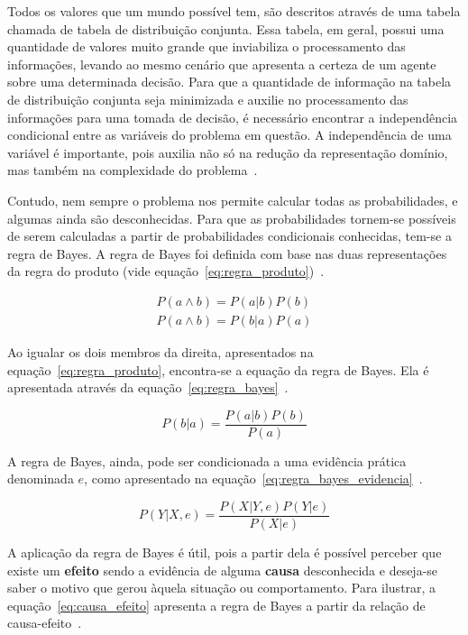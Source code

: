 Todos os valores que um mundo possível tem, são descritos através de uma tabela chamada de tabela de distribuição conjunta. Essa tabela, em geral, possui uma quantidade de valores muito grande que inviabiliza o processamento das informações, levando ao mesmo cenário que apresenta a certeza de um agente sobre uma determinada decisão. Para que a quantidade de informação na tabela de distribuição conjunta seja minimizada e auxilie no processamento das informações para uma tomada de decisão, é necessário encontrar a independência condicional entre as variáveis do problema em questão. A independência de uma variável é importante, pois auxilia não só na redução da representação domínio, mas também na complexidade do problema~\cite{russell:2002, faceli:2011}.

Contudo, nem sempre o problema nos permite calcular todas as probabilidades, e algumas ainda são desconhecidas. Para que as probabilidades tornem-se possíveis de serem calculadas a partir de probabilidades condicionais conhecidas, tem-se a regra de Bayes. A regra de Bayes foi definida com base nas duas representações da regra do produto (vide equação~\ref{eq:regra_produto})~\cite{russell:2002}.

\begin{subequations}
    \label{eq:regra_produto}
    \begin{align}
        P(a \land b) = P(a|b)P(b)\\
        P(a \land b) = P(b|a)P(a)
    \end{align}
\end{subequations}

Ao igualar os dois membros da direita, apresentados na equação~\ref{eq:regra_produto}, encontra-se a equação da regra de Bayes. Ela é apresentada através da equação~\ref{eq:regra_bayes}~\cite{russell:2002}.

\begin{equation}
    \label{eq:regra_bayes}
    P(b|a) = \frac{P(a|b)P(b)}{P(a)}
\end{equation}

A regra de Bayes, ainda, pode ser condicionada a uma evidência prática denominada $e$, como apresentado na equação~\ref{eq:regra_bayes_evidencia}~\cite{russell:2002}.

\begin{equation}
    \label{eq:regra_bayes_evidencia}
    P(Y|X, e) = \frac{P(X|Y, e)P(Y|e)}{P(X|e)}
\end{equation}

A aplicação da regra de Bayes é útil, pois a partir dela é possível perceber que existe um \textbf{efeito} sendo a evidência de alguma \textbf{causa} desconhecida e deseja-se saber o motivo que gerou àquela situação ou comportamento. Para ilustrar, a equação~\ref{eq:causa_efeito} apresenta a regra de Bayes a partir da relação de causa-efeito~\cite{russell:2002}.


